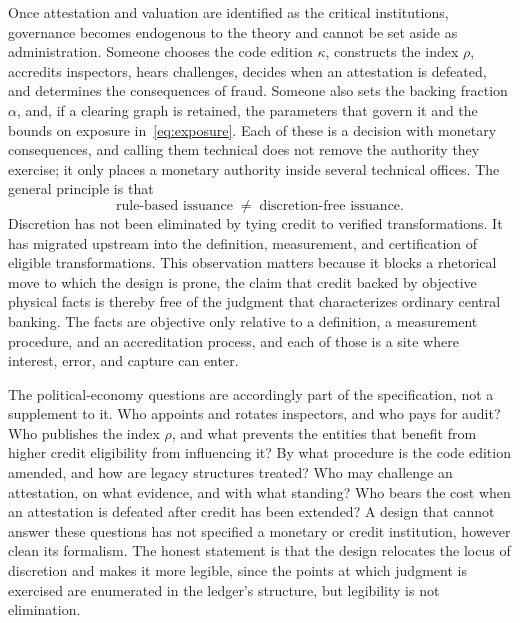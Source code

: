 \documentclass[11pt]{article}
\theoremstyle{definition}
\begin{document}
Once attestation and valuation are identified as the critical institutions, governance becomes endogenous to the theory and cannot be set aside as administration. Someone chooses the code edition $\kappa$, constructs the index $\rho$, accredits inspectors, hears challenges, decides when an attestation is defeated, and determines the consequences of fraud. Someone also sets the backing fraction $\alpha$, and, if a clearing graph is retained, the parameters that govern it and the bounds on exposure in~\eqref{eq:exposure}. Each of these is a decision with monetary consequences, and calling them technical does not remove the authority they exercise; it only places a monetary authority inside several technical offices. The general principle is that
\begin{equation}
\text{rule-based issuance} \;\neq\; \text{discretion-free issuance}.
\label{eq:discretion}
\end{equation}
Discretion has not been eliminated by tying credit to verified transformations. It has migrated upstream into the definition, measurement, and certification of eligible transformations. This observation matters because it blocks a rhetorical move to which the design is prone, the claim that credit backed by objective physical facts is thereby free of the judgment that characterizes ordinary central banking. The facts are objective only relative to a definition, a measurement procedure, and an accreditation process, and each of those is a site where interest, error, and capture can enter.

The political-economy questions are accordingly part of the specification, not a supplement to it. Who appoints and rotates inspectors, and who pays for audit? Who publishes the index $\rho$, and what prevents the entities that benefit from higher credit eligibility from influencing it? By what procedure is the code edition amended, and how are legacy structures treated? Who may challenge an attestation, on what evidence, and with what standing? Who bears the cost when an attestation is defeated after credit has been extended? A design that cannot answer these questions has not specified a monetary or credit institution, however clean its formalism. The honest statement is that the design relocates the locus of discretion and makes it more legible, since the points at which judgment is exercised are enumerated in the ledger's structure, but legibility is not elimination.
\end{document}
